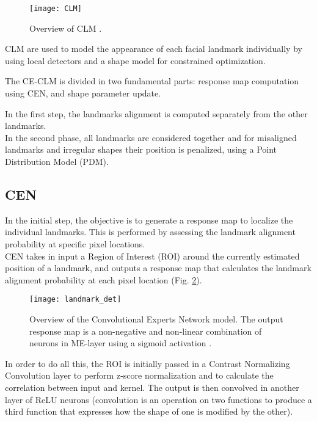 \begin{figure}[H]
	\centering
	\texttt{[image: CLM]}
	\caption{Overview of CLM \cite{clm_cootes}.}
	\label{fig:CLM}
\end{figure}

CLM are used to model the appearance of each facial landmark individually by using local detectors and a shape model for constrained optimization. 

The CE-CLM is divided in two fundamental parts: response map computation using CEN, and shape parameter update.

In the first step, the landmarks alignment is computed separately from the other landmarks. \\
In the second phase, all landmarks are considered together and for misaligned landmarks and irregular shapes their position is penalized, using a Point Distribution Model (PDM).

\subsection{CEN}
In the initial step, the objective is to generate a response map to localize the individual landmarks. This is performed by assessing the landmark alignment probability at specific pixel locations. \\
CEN takes in input a Region of Interest (ROI) around the currently estimated position of a landmark, and outputs a response map that calculates the landmark alignment probability at each pixel location (Fig. \ref{fig:landmark_det}).

\begin{figure}[H]
	\centering
	\texttt{[image: landmark\_det]}
	\caption{Overview of the Convolutional Experts Network model. The output response map is a non-negative and non-linear combination of neurons in ME-layer using a sigmoid activation \cite{Baltru2017}.}
	\label{fig:landmark_det}
\end{figure}

In order to do all this, the ROI is initially passed in a Contrast Normalizing Convolution layer to perform z-score normalization and to calculate the correlation between input and kernel. The output is then convolved in another layer of ReLU neurons (convolution is an operation on two functions to produce a third function that expresses how the shape of one is modified by the other).

